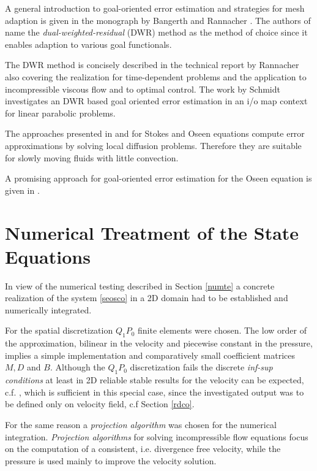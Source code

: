 \documentclass[a4paper,10pt,BCOR=15mm]{scrbook}
\begin{document}
A general introduction to goal-oriented error estimation and strategies for mesh adaption is given in the monograph by Bangerth and Rannacher \cite{bara}. The authors of \cite{bara} name the \textit{dual-weighted-residual} (DWR) method as the method of choice since it enables adaption to various goal functionals. 

The DWR method is concisely described in the technical report by Rannacher \cite{radwr} also covering the realization for time-dependent problems and the application to incompressible viscous flow and to optimal control. The work by Schmidt \cite{schm} investigates an DWR based goal oriented error estimation in an i/o map context for linear parabolic problems. 

The approaches presented in \cite{aiod} and \cite{elma} for Stokes and Oseen equations compute error approximations by solving local diffusion problems. Therefore they are suitable for slowly moving fluids with little convection. 

A promising approach for goal-oriented error estimation for the Oseen equation is given in \cite{odpr}.



\chapter[Numerical Treatment]{Numerical Treatment of the State Equations}\label{ntse}

In view of the numerical testing described in Section \ref{numte} a concrete realization of the system \eqref{seosco} in a 2D domain had to be established and numerically integrated. 

For the spatial discretization $Q_1P_0$ finite elements were chosen. The low order of the approximation, bilinear in the velocity and piecewise constant in the pressure, implies a simple implementation and comparatively small coefficient matrices $M,D$ and $B$. Although the $Q_1P_0$ discretization fails the discrete \textit{inf-sup conditions} at least in 2D reliable stable results for the velocity can be expected, c.f. \cite{gre2,gunz}, which is sufficient in this special case, since the investigated output was to be defined only on velocity field, c.f Section \ref{rdco}.

For the same reason a \textit{projection algorithm} was chosen for the numerical integration. \textit{Projection algorithms} for solving incompressible flow equations focus on the computation of a consistent, i.e. divergence free velocity, while the pressure is used mainly to improve the velocity solution. 
\end{document}
